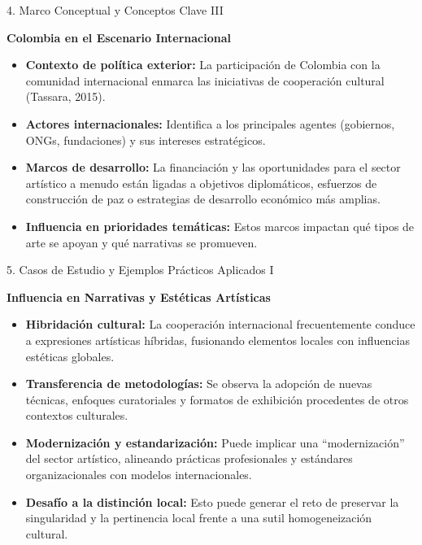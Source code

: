 \documentclass[aspectratio=169]{beamer}
\begin{document}
\begin{frame}[fragile]{4. Marco Conceptual y Conceptos Clave III}


\textbf{Colombia en el Escenario Internacional}

\begin{itemize}
  \item \textbf{Contexto de política exterior:} La participación de Colombia con la comunidad internacional enmarca las iniciativas de cooperación cultural (Tassara, 2015).
  \item \textbf{Actores internacionales:} Identifica a los principales agentes (gobiernos, ONGs, fundaciones) y sus intereses estratégicos.
  \item \textbf{Marcos de desarrollo:} La financiación y las oportunidades para el sector artístico a menudo están ligadas a objetivos diplomáticos, esfuerzos de construcción de paz o estrategias de desarrollo económico más amplias.
  \item \textbf{Influencia en prioridades temáticas:} Estos marcos impactan qué tipos de arte se apoyan y qué narrativas se promueven.
\end{itemize}
\end{frame}



\begin{frame}[fragile]{5. Casos de Estudio y Ejemplos Prácticos Aplicados I}


\textbf{Influencia en Narrativas y Estéticas Artísticas}

\begin{itemize}
  \item \textbf{Hibridación cultural:} La cooperación internacional frecuentemente conduce a expresiones artísticas híbridas, fusionando elementos locales con influencias estéticas globales.
  \item \textbf{Transferencia de metodologías:} Se observa la adopción de nuevas técnicas, enfoques curatoriales y formatos de exhibición procedentes de otros contextos culturales.
  \item \textbf{Modernización y estandarización:} Puede implicar una ``modernización'' del sector artístico, alineando prácticas profesionales y estándares organizacionales con modelos internacionales.
  \item \textbf{Desafío a la distinción local:} Esto puede generar el reto de preservar la singularidad y la pertinencia local frente a una sutil homogeneización cultural.
\end{itemize}
\end{frame}
\end{document}
